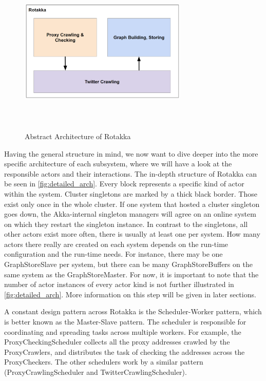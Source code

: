 \documentclass{sigchi}
\begin{document}
\begin{figure}[h]
\centering
\includegraphics[width=8cm,height=8cm,keepaspectratio]{figures/abstract_architecture.PNG}
\caption{Abstract Architecture of Rotakka}
\label{fig:abstract_arch}
\end{figure}

Having the general structure in mind, we now want to dive deeper into the more specific architecture of each subsystem, where we will have a look at the responsible actors and their interactions. The in-depth structure of Rotakka can be seen in \autoref{fig:detailed_arch}. Every block represents a specific kind of actor within the system. Cluster singletons are  marked by a thick black border. Those exist only once in the whole cluster. If one system that hosted a cluster singleton goes down, the Akka-internal singleton managers will agree on an online system on which they restart the singleton instance.
In contrast to the singletons, all other actors exist more often, there is usually at least one per system. How many actors there really are created on each system depends on the run-time configuration and the run-time needs. For instance, there may be one GraphStoreSlave per system, but there can be many GraphStoreBuffers on the same system as the GraphStoreMaster. For now, it is important to note that the number of actor instances of every actor kind is not further illustrated in \autoref{fig:detailed_arch}. More information on this step will be given in later sections. 

A constant design pattern across Rotakka is the Scheduler-Worker pattern, which is better known as the Master-Slave pattern. The scheduler is responsible for coordinating and spreading tasks across multiple workers. For example, the ProxyCheckingScheduler collects all the proxy addresses crawled by the ProxyCrawlers, and distributes the task of checking the addresses across the ProxyCheckers. The other schedulers work by a similar pattern (ProxyCrawlingScheduler and TwitterCrawlingScheduler).
\end{document}
